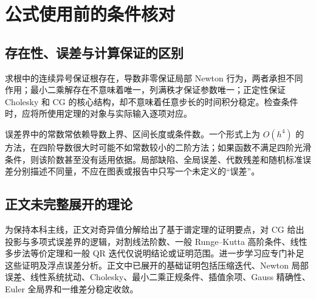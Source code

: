\setcounter{chapter}{1} %
\chapter{公式使用前的条件核对}
\label{app:na-conditions}

\section{存在性、误差与计算保证的区别}
求根中的连续异号保证根存在，导数非零保证局部 Newton 行为，两者承担不同作用；最小二乘解存在不意味着唯一，列满秩才保证参数唯一；正定性保证 Cholesky 和 CG 的核心结构，却不意味着任意步长的时间积分稳定。检查条件时，应将所使用定理的对象与实际输入逐项对应。

误差界中的常数常依赖导数上界、区间长度或条件数。一个形式上为 $O(h^4)$ 的方法，在四阶导数很大时可能不如常数较小的二阶方法；如果函数不满足四阶光滑条件，则该阶数甚至没有适用依据。局部缺陷、全局误差、代数残差和随机标准误差分别描述不同量，不应在图表或报告中只写一个未定义的“误差”。

\section{正文未完整展开的理论}
为保持本科主线，正文对奇异值分解给出了基于谱定理的证明要点，对 CG 给出投影与多项式误差界的逻辑，对割线法阶数、一般 Runge--Kutta 高阶条件、线性多步法等价定理和一般 QR 迭代仅说明结论或证明范围。进一步学习应专门补足这些证明及浮点误差分析。正文中已展开的基础证明包括压缩迭代、Newton 局部误差、线性系统扰动、Cholesky、最小二乘正规条件、插值余项、Gauss 精确性、Euler 全局界和一维差分稳定收敛。

